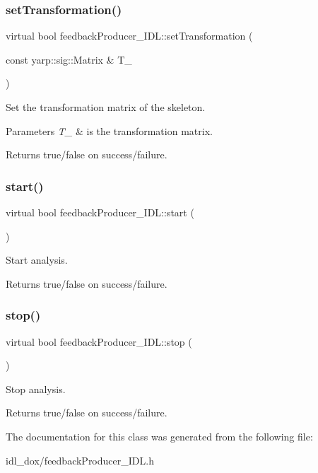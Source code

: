 \subsubsection{\texorpdfstring{set\+Transformation()}{setTransformation()}}
{\footnotesize\ttfamily virtual bool feedback\+Producer\+\_\+\+I\+D\+L\+::set\+Transformation (\begin{DoxyParamCaption}\item[{const yarp\+::sig\+::\+Matrix \&}]{T\+\_\+ }\end{DoxyParamCaption})\hspace{0.3cm}{\ttfamily [virtual]}}



Set the transformation matrix of the skeleton. 


\begin{DoxyParams}{Parameters}
{\em T\+\_\+} & is the transformation matrix. \\
\hline
\end{DoxyParams}
\begin{DoxyReturn}{Returns}
true/false on success/failure. 
\end{DoxyReturn}
\mbox{\label{classfeedbackProducer__IDL_a50c492862766e36f730439a3a8f0d910}} 
\subsubsection{\texorpdfstring{start()}{start()}}
{\footnotesize\ttfamily virtual bool feedback\+Producer\+\_\+\+I\+D\+L\+::start (\begin{DoxyParamCaption}{ }\end{DoxyParamCaption})\hspace{0.3cm}{\ttfamily [virtual]}}



Start analysis. 

\begin{DoxyReturn}{Returns}
true/false on success/failure. 
\end{DoxyReturn}
\mbox{\label{classfeedbackProducer__IDL_afdfffd0edb784e0a9906ed33e164027b}} 
\subsubsection{\texorpdfstring{stop()}{stop()}}
{\footnotesize\ttfamily virtual bool feedback\+Producer\+\_\+\+I\+D\+L\+::stop (\begin{DoxyParamCaption}{ }\end{DoxyParamCaption})\hspace{0.3cm}{\ttfamily [virtual]}}



Stop analysis. 

\begin{DoxyReturn}{Returns}
true/false on success/failure. 
\end{DoxyReturn}


The documentation for this class was generated from the following file\+:\begin{DoxyCompactItemize}
\item 
idl\+\_\+dox/feedback\+Producer\+\_\+\+I\+D\+L.\+h\end{DoxyCompactItemize}
